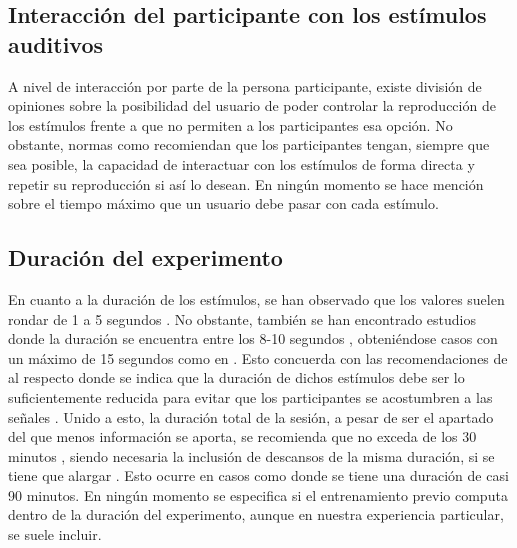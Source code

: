 \documentclass[11pt,a4paper]{book}
\begin{document}
	    \subsection{Interacción del participante con los estímulos auditivos}
    		A nivel de interacción por parte de la persona participante, existe división de opiniones sobre la posibilidad del usuario de poder controlar la reproducción de los estímulos \cite{1995GASoulodre, 2010FMartellotta, 2010MVigeant, 2011VEmiya,2019DMorikawa} frente a \cite{1999JBradley, 2002PZahorik, 2005IWitew, 2016SKlockgether, 2019VRajala, 2019VHongisto} que no permiten a los participantes esa opción. No obstante, normas como \cite{UIT1116,UIT1534, UIT1284,EBU3286, UIT1285, UIT1286} recomiendan que los participantes tengan, siempre que sea posible, la capacidad de interactuar con los estímulos de forma directa y repetir su reproducción si así lo desean. En ningún momento se hace mención sobre el tiempo máximo que un usuario debe pasar con cada estímulo.
	
        \subsection{Duración del experimento}
    		En cuanto a la duración de los estímulos, se han observado que los valores suelen rondar de 1 a 5 segundos \cite{2010FMartellotta, 2016SKlockgether, 2011VEmiya, 2019LKritly, 2019GPulvirenti, 2002PZahorik, 2019MShiell, 2019JGroose, 2019MNowak, 2019MYamada, 2019DMorikawa, 2019DJSchlit}. No obstante, también se han encontrado estudios donde la duración se encuentra entre los 8-10 segundos \cite{2010FMartellotta, 2019JLee, 2010MVigeant}, obteniéndose casos con un máximo de 15 segundos como en \cite{1995GASoulodre, 2005IWitew}. Esto concuerda con las recomendaciones de \cite{UIT1116,UIT1534, UIT1284,EBU3286, UIT1285, UIT1286} al respecto donde se indica que la duración de dichos estímulos debe ser lo suficientemente reducida para evitar que los participantes se acostumbren a las señales \cite{GelfandStanley}. Unido a esto, la duración total de la sesión, a pesar de ser el apartado del que menos información se aporta, se recomienda que no exceda de los 30 minutos , siendo necesaria la inclusión de descansos de la misma duración, si se tiene que alargar \cite{UIT1116, UIT1284, UIT1534, ZwickerFactsModels, GelfandStanley, BlauertSpatialHearing}. Esto ocurre en casos como \cite{2019LKritly} donde se tiene una duración de casi 90 minutos. En ningún momento se especifica si el entrenamiento previo computa dentro de la duración del experimento, aunque en nuestra experiencia particular, se suele incluir.
    
\end{document}
